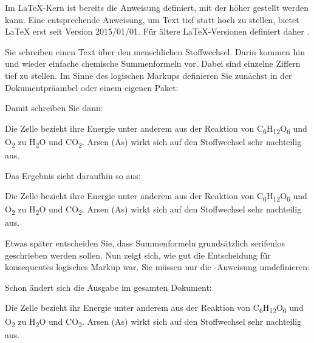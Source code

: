 %
  \begin{Declaration}
  \end{Declaration}
  Im \LaTeX-Kern ist bereits die Anweisung
   definiert, mit der
   höher gestellt werden kann.  Eine
  entsprechende Anweisung, um Text tief statt
  hoch zu stellen, bietet
  \LaTeX{} erst seit Version
  2015/01/01. Für ältere \LaTeX-Versionen definiert \KOMAScript{} daher
  . %
  \ifthiscommonfirst
    \begin{Example}
      Sie schreiben einen Text über den menschlichen Stoffwechsel. Darin
      kommen hin und wieder einfache chemische Summenformeln vor. Dabei sind
      einzelne Ziffern tief zu stellen. Im Sinne des logischen Markups
      definieren Sie zunächst in der Dokumentpräambel oder einem eigenen
      Paket:
\begin{lstcode}
  \newcommand*{\Molek}[2]{#1\textsubscript{#2}}
\end{lstcode}
      \newcommand*{\Molek}[2]{#1\textsubscript{#2}}%
      Damit schreiben Sie dann:
\begin{lstcode}
  Die Zelle bezieht ihre Energie unter anderem aus
  der Reaktion von \Molek C6\Molek H{12}\Molek O6 
  und \Molek O2 zu \Molek H2\Molek O{} und 
  \Molek C{}\Molek O2. Arsen (\Molek{As}{}) wirkt
  sich auf den Stoffwechsel sehr nachteilig aus.
\end{lstcode}
      Das Ergebnis sieht daraufhin so aus:
      \begin{ShowOutput}
        Die Zelle bezieht ihre Energie unter anderem
        aus der Reaktion von 
        \Molek C6\Molek H{12}\Molek O6 und \Molek O2 zu
        \Molek H2\Molek O{} und \Molek C{}\Molek O2.  
        Arsen (\Molek{As}{}) wirkt sich auf
        den Stoffwechsel sehr nachteilig aus.
      \end{ShowOutput}

      Etwas später entscheiden Sie, dass Summenformeln grundsätzlich
      serifenlos geschrieben werden sollen. Nun zeigt sich, wie gut die
      Entscheidung für konsequentes logisches Markup war. Sie müssen nur die
      -Anweisung umdefinieren:
\begin{lstcode}
  \newcommand*{\Molek}[2]{%
    \textsf{#1\textsubscript{#2}}%
  }
\end{lstcode}
      \renewcommand*{\Molek}[2]{\textsf{#1\textsubscript{#2}}}%
      Schon ändert sich die Ausgabe im gesamten Dokument:
      \begin{ShowOutput}
        Die Zelle bezieht ihr Energie unter anderem aus der Reaktion von
        \Molek C6\Molek H{12}\Molek O6 und \Molek O2 zu \Molek H2\Molek
        O{} und \Molek C{}\Molek O2.  Arsen (\Molek{As}{}) wirkt sich
        auf den Stoffwechsel sehr nachteilig aus.
      \end{ShowOutput}
    \end{Example}
